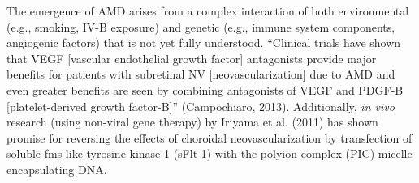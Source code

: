 The emergence of AMD arises from a complex interaction of both environmental (e.g., smoking, IV-B exposure) and genetic (e.g., immune system components, angiogenic factors) that is not yet fully understood. ``Clinical trials have shown that VEGF [vascular endothelial growth factor] antagonists provide major benefits for patients with subretinal NV [neovascularization] due to AMD and even greater benefits are seen by combining antagonists of VEGF and PDGF-B [platelet-derived growth factor-B]'' (Campochiaro, 2013). Additionally, \textit{in vivo} research (using non-viral gene therapy) by Iriyama et al. (2011) has shown promise for reversing the effects of choroidal neovascularization by transfection of soluble fms-like tyrosine kinase-1 (sFlt-1) with the polyion complex (PIC) micelle encapsulating DNA.

